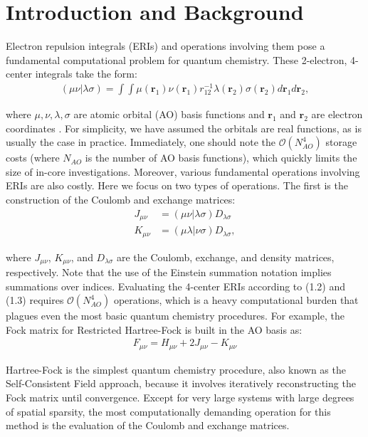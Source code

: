 \chapter{Introduction and Background}

Electron repulsion integrals (ERIs) and operations involving them pose a fundamental
computational problem for quantum chemistry. These 2-electron, 4-center integrals take the form:
\begin{align}(\mu \nu | \lambda \sigma) = \int \int \mu(\textbf{r}_{1}) 
\nu(\textbf{r}_{1}) r^{-1}_{12} \lambda(\textbf{r}_{2}) \sigma(\textbf{r}_{2}) 
d{\textbf{r}_{1}}d{\textbf{r}_{2}},
\end{align}

\noindent where $\mu, \nu, \lambda, \sigma$ are atomic orbital (AO) basis functions and $\textbf{r}_{1}$ and $\textbf{r}_{2}$
are electron coordinates \cite{ref1}. For simplicity, we have assumed the orbitals are real functions, as is usually
the case in practice. Immediately, one should note the $\mathcal{O}(N_{AO}^4)$ storage costs (where $N_{AO}$ is
the number of AO basis functions), which quickly 
limits the size of in-core investigations. Moreover, various fundamental operations involving ERIs 
are also costly. Here we focus on two types of operations. 
The first is the construction of the Coulomb and exchange matrices:
\begin{align}
J_{\mu \nu} &= (\mu \nu|\lambda \sigma)D_{\lambda \sigma} \\
K_{\mu \nu} &= (\mu \lambda|\nu \sigma)D_{\lambda \sigma},
\end{align}

\noindent where $J_{\mu \nu}$, $K_{\mu \nu}$, 
and $D_{\lambda \sigma}$ are the Coulomb, exchange, and density matrices, respectively.
Note that the use of the Einstein summation notation implies summations over indices.
Evaluating the 4-center ERIs according to (1.2) and (1.3) requires $\mathcal{O}(N_{AO}^4)$ operations, 
which is a heavy computational burden that plagues even the most basic quantum chemistry procedures.
For example, the Fock matrix for Restricted Hartree-Fock is built in the AO basis as:
\begin{align}
F_{\mu \nu} = H_{\mu \nu} + 2J_{\mu \nu} - K_{\mu \nu}
\end{align} 

\noindent Hartree-Fock is the simplest quantum chemistry procedure, also known as the Self-Consistent Field approach, 
because it involves iteratively
reconstructing the Fock matrix until convergence. Except for very large systems with large degrees of spatial sparsity, 
the most computationally demanding operation for this
method is the evaluation of the Coulomb and exchange matrices. 
 
